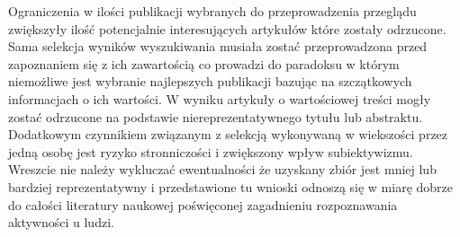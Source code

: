 Ograniczenia w ilości publikacji wybranych do przeprowadzenia przeglądu zwiększyły ilość potencjalnie interesujących artykułów które zostały odrzucone. Sama selekcja wyników wyszukiwania musiała zostać przeprowadzona przed zapoznaniem się z ich zawartością co prowadzi do paradoksu w którym niemożliwe jest wybranie najlepszych publikacji bazując na szczątkowych informacjach o ich wartości. W wyniku artykuły o wartościowej treści mogły zostać odrzucone na podstawie niereprezentatywnego tytułu lub abstraktu. Dodatkowym czynnikiem związanym z selekcją wykonywaną w wiekszości przez jedną osobę jest ryzyko stronniczości i zwiększony wpływ subiektywizmu. Wreszcie nie należy wykluczać ewentualności że uzyskany zbiór jest mniej lub bardziej reprezentatywny i przedstawione tu wnioski odnoszą się w miarę dobrze do całości literatury naukowej poświęconej zagadnieniu rozpoznawania aktywności u ludzi.
